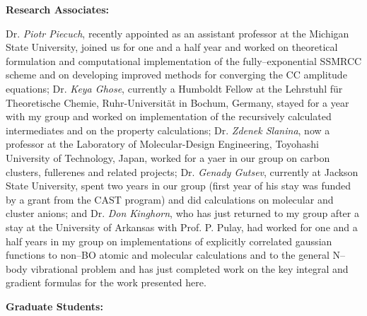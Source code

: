 \vspace{2mm}

\noindent
{\bf Research Associates:}

Dr. {\em Piotr Piecuch}, recently appointed as an 
assistant professor at the Michigan State University, joined us for
one and a half year and worked on theoretical formulation and 
computational implementation of the fully--exponential
SSMRCC scheme and on developing improved 
methods for converging the CC amplitude equations;  
Dr. {\em Keya Ghose}, 
currently a Humboldt Fellow at the 
Lehrstuhl f\"{u}r Theoretische Chemie, Ruhr-Universit\"{a}t in Bochum,
Germany, stayed for a year with my group and 
worked on implementation of the recursively calculated
intermediates and on the property calculations;  
Dr. {\em  Zdenek Slanina}, 
now a professor at the Laboratory
of Molecular-Design Engineering,
Toyohashi University of Technology, Japan,
worked for a yaer in our group on carbon clusters, fullerenes and
related projects;  
Dr. {\em Genady Gutsev}, 
currently
at Jackson State University, 
spent two years in our group (first year of his stay was
funded by a grant from the CAST program) and did 
calculations on molecular and cluster anions; 
and Dr. {\em Don Kinghorn}, 
who has just returned to my group 
after a stay at the University of Arkansas with Prof. P. Pulay,
had worked for one and a half years in my group 
on implementations of explicitly correlated gaussian functions
to non--BO atomic and molecular calculations and 
to the general N--body vibrational problem and has just completed
work on the key integral and gradient formulas for the work 
presented here.

\vspace{2mm}

\noindent
{\bf Graduate Students:}

